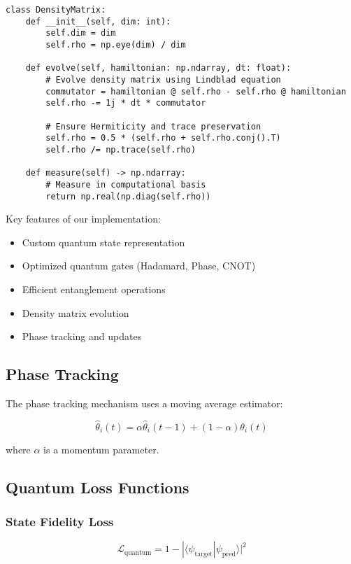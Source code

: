 \documentclass[10pt]{article}
\begin{document}
\begin{verbatim}
class DensityMatrix:
    def __init__(self, dim: int):
        self.dim = dim
        self.rho = np.eye(dim) / dim
        
    def evolve(self, hamiltonian: np.ndarray, dt: float):
        # Evolve density matrix using Lindblad equation
        commutator = hamiltonian @ self.rho - self.rho @ hamiltonian
        self.rho -= 1j * dt * commutator
        
        # Ensure Hermiticity and trace preservation
        self.rho = 0.5 * (self.rho + self.rho.conj().T)
        self.rho /= np.trace(self.rho)
    
    def measure(self) -> np.ndarray:
        # Measure in computational basis
        return np.real(np.diag(self.rho))
\end{verbatim}

Key features of our implementation:

\begin{itemize}
    \item Custom quantum state representation
    \item Optimized quantum gates (Hadamard, Phase, CNOT)
    \item Efficient entanglement operations
    \item Density matrix evolution
    \item Phase tracking and updates
\end{itemize}

\subsection{Phase Tracking}
The phase tracking mechanism uses a moving average estimator:

\begin{equation}
    \hat{\theta}_i(t) = \alpha\hat{\theta}_i(t-1) + (1-\alpha)\theta_i(t)
\end{equation}

where $\alpha$ is a momentum parameter.

\subsection{Quantum Loss Functions}

\subsubsection{State Fidelity Loss}
\begin{equation}
    \mathcal{L}_{\text{quantum}} = 1 - |\langle\psi_{\text{target}}|\psi_{\text{pred}}\rangle|^2
\end{equation}
\end{document}
